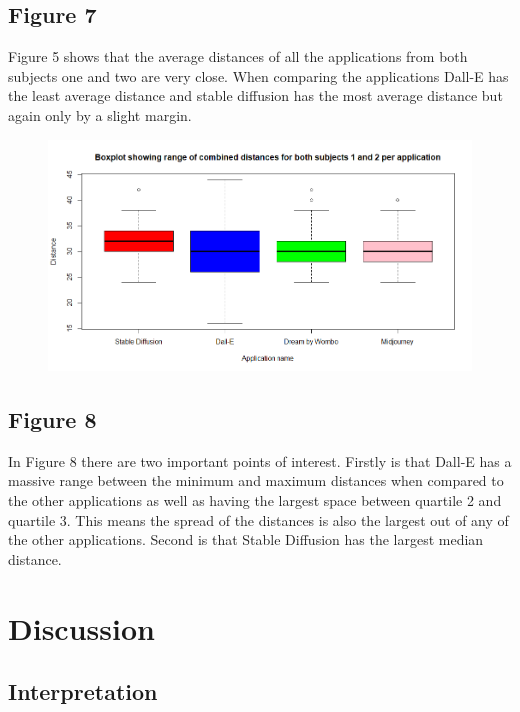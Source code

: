 \documentclass[]{report}
\begin{document}
\subsection{Figure 7}
Figure 5 shows that the average distances of all the applications from both subjects one and two are very close. When comparing the applications Dall-E has the least average distance and stable diffusion has the most average distance but again only by a slight margin. 
	
	\begin{figure}[!htbp]
		\centering
		\includegraphics[width=1\linewidth]{boxplotWithAllData}
		\caption{}
		\label{fig:boxplotwithalldata}
	\end{figure}
\pagebreak
\subsection{Figure 8}
	
	In Figure 8 there are two important points of interest. Firstly is that Dall-E has a massive range between the minimum and maximum distances when compared to the other applications as well as having the largest space between quartile 2 and quartile 3. This means the spread of the distances is also the largest out of any of the other applications. Second is that Stable Diffusion has the largest median distance. 
	
	
	\pagebreak
	\section{Discussion}
	
	\subsection{Interpretation}
	
\end{document}

